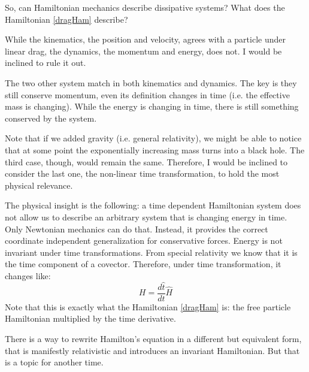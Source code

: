 \documentclass[aps,pra,10pt,floatfix,nofootinbib]{revtex4-1}
\theoremstyle{definition}
\begin{document}
So, can Hamiltonian mechanics describe dissipative systems? What does the Hamiltonian \eqref{dragHam} describe?

While the kinematics, the position and velocity, agrees with a particle under linear drag, the dynamics, the momentum and energy, does not. I would be inclined to rule it out.

The two other system match in both kinematics and dynamics. The key is they still conserve momentum, even its definition changes in time (i.e. the effective mass is changing). While the energy is changing in time, there is still something conserved by the system.

Note that if we added gravity (i.e. general relativity), we might be able to notice that at some point the exponentially increasing mass turns into a black hole. The third case, though, would remain the same. Therefore, I would be inclined to consider the last one, the non-linear time transformation, to hold the most physical relevance.

The physical insight is the following: a time dependent Hamiltonian system does not allow us to describe an arbitrary system that is changing energy in time. Only Newtonian mechanics can do that. Instead, it provides the correct coordinate independent generalization for conservative forces. Energy is not invariant under time transformations. From special relativity we know that it is the time component of a covector. Therefore, under time transformation, it changes like:
\begin{equation}
H=\frac{d\hat{t}}{dt}\hat{H}
\end{equation}
Note that this is exactly what the Hamiltonian \eqref{dragHam} is: the free particle Hamiltonian multiplied by the time derivative.

There is a way to rewrite Hamilton's equation in a different but equivalent form, that is manifestly relativistic and introduces an invariant Hamiltonian. But that is a topic for another time.
\end{document}
